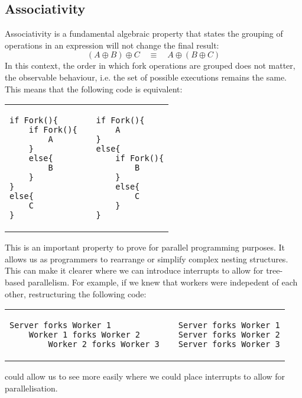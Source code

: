 \documentclass[logo,bsc,singlespacing,parskip]{infthesis}
\begin{document}
\subsection*{Associativity}
Associativity is a fundamental algebraic property that states the grouping of operations in an expression will not change the final result: 
\[
(A \oplus B) \oplus C \quad \equiv \quad A \oplus (B \oplus C)
\]
In this context, the order in which fork operations are grouped does not matter, the observable behaviour, i.e. the set of possible executions remains the same. This means that the following code is equivalent:
\begin{table}[h]
\centering
\begin{tabular}{p{} c p{}}
\begin{lstlisting}
if Fork(){
    if Fork(){
        A
    }
    else{
        B
    }
}
else{
    C
}
\end{lstlisting}
&
&
\begin{lstlisting}
if Fork(){
    A
} 
else{
    if Fork(){
        B
    }
    else{
        C
    }
}
\end{lstlisting}
\end{tabular}
\end{table}
\vspace{-2em}

This is an important property to prove for parallel programming purposes. It allows us as programmers to rearrange or simplify complex nesting structures. This can make it clearer where we can introduce interrupts to allow for tree-based parallelism.
For example, if we knew that workers were indepedent of each other, restructuring the following code:

\vspace{-1em} %
\begin{table}[h]
\centering
\begin{tabular}{p{} c p{}}
\begin{lstlisting}
Server forks Worker 1
    Worker 1 forks Worker 2
        Worker 2 forks Worker 3
\end{lstlisting}
&
&
\begin{lstlisting}
Server forks Worker 1
Server forks Worker 2
Server forks Worker 3
\end{lstlisting}
\end{tabular}
\end{table}
\vspace{-1em} %
could allow us to see more easily where we could place interrupts to allow for parallelisation.
\end{document}
